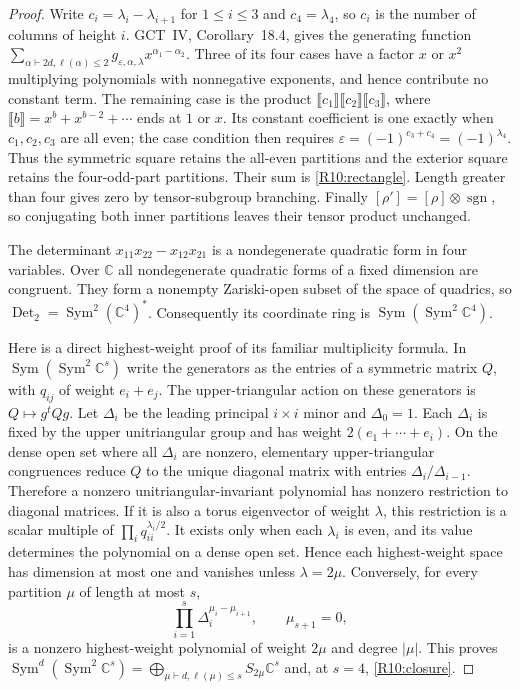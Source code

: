 \begin{proof}
Write $c_i=\lambda_i-\lambda_{i+1}$ for $1\leq i\leq3$ and
$c_4=\lambda_4$, so $c_i$ is the number of columns of height $i$.
GCT~IV, Corollary~18.4, gives the generating function
$\sum_{\alpha\vdash2d,\ell(\alpha)\leq2}
g_{\varepsilon,\alpha,\lambda}x^{\alpha_1-\alpha_2}$.
Three of its four cases have a factor $x$ or $x^2$ multiplying
polynomials with nonnegative exponents, and hence contribute no
constant term. The remaining case is the product
$\llbracket c_1\rrbracket\llbracket c_2\rrbracket
\llbracket c_3\rrbracket$, where
$\llbracket b\rrbracket=x^b+x^{b-2}+\cdots$ ends at $1$ or $x$.
Its constant coefficient is one exactly when $c_1,c_2,c_3$ are all
even; the case condition then requires
$\varepsilon=(-1)^{c_3+c_4}=(-1)^{\lambda_4}$.
Thus the symmetric square retains the all-even partitions and the
exterior square retains the four-odd-part partitions. Their sum is
\eqref{R10:rectangle}. Length greater than four gives zero by
tensor-subgroup branching. Finally
$[\rho']=[\rho]\otimes\operatorname{sgn}$, so conjugating both
inner partitions leaves their tensor product unchanged.

The determinant $x_{11}x_{22}-x_{12}x_{21}$ is a nondegenerate
quadratic form in four variables. Over $\mathbb C$ all nondegenerate
quadratic forms of a fixed dimension are congruent. They form a
nonempty Zariski-open subset of the space of quadrics, so
$\operatorname{Det}_2=\operatorname{Sym}^2(\mathbb C^4)^*$.
Consequently its coordinate ring is
$\operatorname{Sym}(\operatorname{Sym}^2\mathbb C^4)$.

Here is a direct highest-weight proof of its familiar multiplicity
formula. In $\operatorname{Sym}(\operatorname{Sym}^2\mathbb C^s)$
write the generators as the entries of a symmetric matrix $Q$,
with $q_{ij}$ of weight $e_i+e_j$. The upper-triangular action on
these generators is $Q\mapsto g^tQg$.
Let $\Delta_i$ be the leading principal $i\times i$ minor and
$\Delta_0=1$. Each $\Delta_i$ is fixed by the upper unitriangular
group and has weight $2(e_1+\cdots+e_i)$.
On the dense open set where all $\Delta_i$ are nonzero, elementary
upper-triangular congruences reduce $Q$ to the unique diagonal
matrix with entries $\Delta_i/\Delta_{i-1}$.
Therefore a nonzero unitriangular-invariant polynomial has nonzero
restriction to diagonal matrices. If it is also a torus eigenvector
of weight $\lambda$, this restriction is a scalar multiple of
$\prod_i q_{ii}^{\lambda_i/2}$. It exists only when each
$\lambda_i$ is even, and its value determines the polynomial on a
dense open set. Hence each highest-weight space has dimension at
most one and vanishes unless $\lambda=2\mu$.
Conversely, for every partition $\mu$ of length at most $s$,
\[
 \prod_{i=1}^s\Delta_i^{\mu_i-\mu_{i+1}},\qquad\mu_{s+1}=0,
\]
is a nonzero highest-weight polynomial of weight $2\mu$ and
degree $|\mu|$. This proves
$\operatorname{Sym}^d(\operatorname{Sym}^2\mathbb C^s)
=\bigoplus_{\mu\vdash d,\ell(\mu)\leq s}S_{2\mu}\mathbb C^s$
and, at $s=4$, \eqref{R10:closure}.
\end{proof}

